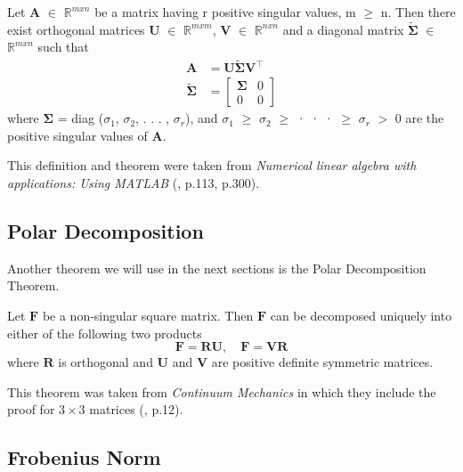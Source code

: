\begin{theorem}
\label{SVD}
Let $\mathbf{A}$ $\in$ $\mathbb{R}^{m x n}$ be a matrix having r positive singular values, m $\geq$ n. Then there exist orthogonal matrices $\mathbf{U}$ $\in$ $\mathbb{R}^{m x m}$, $\mathbf{V}$ $\in$ $\mathbb{R}^{n x n}$ and a diagonal matrix $\mathbf{\tilde{\Sigma}}$ $\in$ $\mathbb{R}^{m x n}$ such that
\begin{align*}
\mathbf{A} &= \mathbf{U \tilde{\Sigma} V^\intercal} \\
\mathbf{\tilde{\Sigma}} &= \left[ \begin{array}{cc} \mathbf{\Sigma} & 0 \\ 0 & 0 \end{array} \right]
\end{align*}
where $\mathbf{\Sigma}$ = diag ($\sigma_1$, $\sigma_2$, . . . , $\sigma_r$), and $\sigma_1$ $\geq$ $\sigma_2$ $\geq$ · · · $\geq$ $\sigma_r$ $>$ 0 are the positive singular values of $\mathbf{A}$.
\end{theorem}

This definition and theorem were taken from \textit{Numerical linear algebra with applications: Using MATLAB} (\cite{ford2014numerical}, p.113, p.300).


\subsection{Polar Decomposition}
Another theorem we will use in the next sections is the Polar Decomposition Theorem.

\begin{theorem}
\label{PD}

Let $\mathbf{F}$ be a non-singular square matrix. Then $\mathbf{F}$ can be decomposed uniquely into either of the following two products
\[
\mathbf{F} = \mathbf{RU}, \quad \mathbf{F} = \mathbf{VR}
\]
where $\mathbf{R}$ is orthogonal and $\mathbf{U}$ and $\mathbf{V}$ are positive definite symmetric matrices.
\end{theorem}

This theorem was taken from \textit{Continuum Mechanics} in which they include the proof for $3 \times 3$ matrices (\cite{Spencer1980}, p.12).

\subsection{Frobenius Norm}

